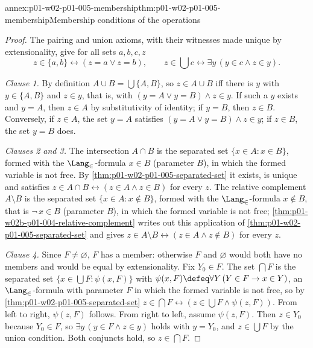 \begin{annexitem}{annex:p01-w02-p01-005-membership}{thm:p01-w02-p01-005-membership}{Membership conditions of the operations}
\begin{proof}
The pairing and union axioms, with their witnesses made unique by
extensionality, give for all sets \(a,b,c,z\)
\[
  z\in\{a,b\}\leftrightarrow(z=a\lor z=b),\qquad
  z\in\textstyle\bigcup c\leftrightarrow\exists y\,(y\in c\land z\in y).
\]

\emph{Clause 1.} By definition \(A\cup B=\bigcup\{A,B\}\), so
\(z\in A\cup B\) iff there is \(y\) with \(y\in\{A,B\}\) and \(z\in y\), that
is, with \((y=A\lor y=B)\land z\in y\). If such a \(y\) exists and \(y=A\),
then \(z\in A\) by substitutivity of identity; if \(y=B\), then \(z\in B\).
Conversely, if \(z\in A\), the set \(y=A\) satisfies
\((y=A\lor y=B)\land z\in y\); if \(z\in B\), the set \(y=B\) does.

\emph{Clauses 2 and 3.} The intersection \(A\cap B\) is the separated set
\(\{x\in A:x\in B\}\), formed with the \(\Lang_{\in}\)-formula \(x\in B\)
(parameter \(B\)), in which the formed variable is not free. By
\cref{thm:p01-w02-p01-005-separated-set} it exists, is unique and satisfies
\(z\in A\cap B\leftrightarrow(z\in A\land z\in B)\) for every \(z\). The relative
complement \(A\setminus B\) is the separated set \(\{x\in A:x\notin B\}\),
formed with the \(\Lang_{\in}\)-formula \(x\notin B\), that is
\(\neg\,x\in B\) (parameter \(B\)), in which the formed variable is not free;
\cref{thm:p01-w02b-p01-004-relative-complement} writes out this application of
\cref{thm:p01-w02-p01-005-separated-set} and gives
\(z\in A\setminus B\leftrightarrow(z\in A\land z\notin B)\) for every \(z\).

\emph{Clause 4.} Since \(F\neq\varnothing\), \(F\) has a member: otherwise
\(F\) and \(\varnothing\) would both have no members and would be equal by
extensionality. Fix \(Y_0\in F\). The set \(\bigcap F\) is the separated set
\(\{x\in\bigcup F:\psi(x,F)\}\) with
\(\psi(x,F)\defeq\forall Y\,(Y\in F\to x\in Y)\), an \(\Lang_{\in}\)-formula
with parameter \(F\) in which the formed variable is not free, so by
\cref{thm:p01-w02-p01-005-separated-set}
\(z\in\bigcap F\leftrightarrow(z\in\bigcup F\land\psi(z,F))\). From left to
right, \(\psi(z,F)\) follows. From right to left, assume \(\psi(z,F)\). Then
\(z\in Y_0\) because \(Y_0\in F\), so \(\exists y\,(y\in F\land z\in y)\) holds
with \(y=Y_0\), and \(z\in\bigcup F\) by the union condition. Both conjuncts
hold, so \(z\in\bigcap F\).


\end{proof}
\end{annexitem}

